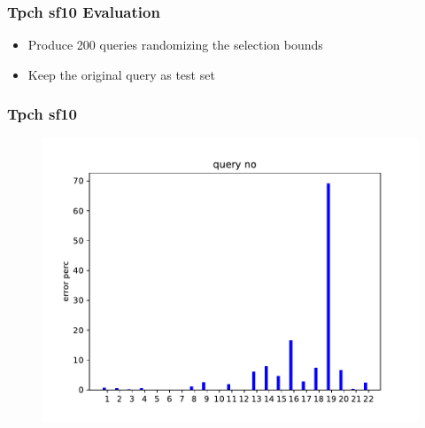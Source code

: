 \begin{frame}[fragile]
\frametitle{Tpch sf10 Evaluation}
\begin{block}{}
\begin{itemize}
	\item Produce 200 queries randomizing the selection bounds
	\item Keep the original query as test set
\end{itemize}
\end{block}
\end{frame}


\begin{frame}[fragile]
	\frametitle{Tpch sf10}
  \begin{figure}[t]
    \centering
    \includegraphics[width=1.0\textwidth]{../figs/tpch10/mem_error_1-23.pdf}
  \end{figure}
\end{frame}


